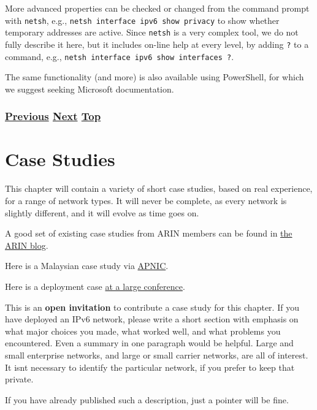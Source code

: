 \documentclass[
]{article}
\begin{document}
More advanced properties can be checked or changed from the command
prompt with \texttt{netsh}, e.g.,
\texttt{netsh\ interface\ ipv6\ show\ privacy} to show whether temporary
addresses are active. Since \texttt{netsh} is a very complex tool, we do
not fully describe it here, but it includes on-line help at every level,
by adding \texttt{?} to a command, e.g.,
\texttt{netsh\ interface\ ipv6\ show\ interfaces\ ?}.

The same functionality (and more) is also available using PowerShell,
for which we suggest seeking Microsoft documentation.

\subsubsection{\texorpdfstring{\hyperref[packet-size-and-jumbo-frames]{Previous}
\hyperref[case-studies]{Next}
\hyperref[management-and-operations]{Top}}{Previous Next Top}}\label{previous-next-top-34}

\pagebreak

\section{Case Studies}\label{case-studies}

This chapter will contain a variety of short case studies, based on real
experience, for a range of network types. It will never be complete, as
every network is slightly different, and it will evolve as time goes on.

A good set of existing case studies from ARIN members can be found in
\href{https://www.arin.net/blog/ipv6/}{the ARIN blog}.

Here is a Malaysian case study via
\href{https://blog.apnic.net/2023/03/17/telekom-malaysias-ipv6-readiness-journey/}{APNIC}.

Here is a deployment case
\href{https://nsrc.org/blog/apricot-ipv6-only}{at a large conference}.

This is an \textbf{open invitation} to contribute a case study for this
chapter. If you have deployed an IPv6 network, please write a short
section with emphasis on what major choices you made, what worked well,
and what problems you encountered. Even a summary in one paragraph would
be helpful. Large and small enterprise networks, and large or small
carrier networks, are all of interest. It isn\textquotesingle t
necessary to identify the particular network, if you prefer to keep that
private.

If you have already published such a description, just a pointer will be
fine.
\end{document}
